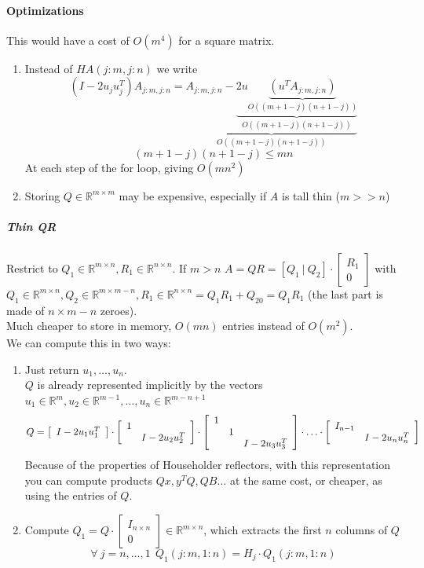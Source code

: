 \documentclass[10pt]{report}
\begin{document}
\paragraph{Optimizations}
This would have a cost of $O(m^4)$ for a square matrix.
\begin{enumerate}
	\item Instead of $HA(j:m,j:n)$ we write
	$$(I-2u_ju_j^T)A_{j:m,j:n}=\underset{O((m+1-j)(n+1-j))}{\underbrace{A_{j:m,j:n}-\underset{O((m+1-j)(n+1-j))}{\underbrace{2u \underset{O((m+1-j)(n+1-j))}{\underbrace{(u^TA_{j:m,j:n})}}}}}}$$
	$$(m+1-j)(n+1-j)\leq mn$$
	At each step of the for loop, giving $O(mn^2)$
	\item Storing $Q \in \mathbb{R}^{m\times m}$ may be expensive, especially if $A$ is tall thin ($m>>n$)
\end{enumerate}
\subparagraph{Thin QR} Restrict to $Q_1\in\mathbb{R}^{m\times n}, R_1\in\mathbb{R}^{n\times n}$. If $m>n$ $A=QR = [Q_1\:|\:Q_2]\cdot\left[\begin{array}{c}
R_1\\\hline0
\end{array}\right]$ with $Q_1\in \mathbb{R}^{m\times n}, Q_2\in \mathbb{R}^{m\times m-n}, R_1\in \mathbb{R}^{n\times n} = Q_1R_1+Q_20 = Q_1R_1$ (the last part is made of $n\times m-n$ zeroes).\\
Much cheaper to store in memory, $O(mn)$ entries instead of $O(m^2)$.\\
We can compute this in two ways:
\begin{enumerate}
	\item Just return $u_1,\ldots,u_n$.\\
	$Q$ is already represented implicitly by the vectors $u_1\in\mathbb{R}^m,u_2\in\mathbb{R}^{m-1},\ldots,u_n\in\mathbb{R}^{m-n+1}$
	$$Q=\left[\begin{array}{c}
	I-2u_1u_1^T
	\end{array}\right]\cdot\left[\begin{array}{c c}
	1\\
	&I-2u_2u_2^T
	\end{array}\right]\cdot\left[\begin{array}{c c c}
	1\\
	&1\\
	&&I-2u_3u_3^T
	\end{array}\right]\cdot\ldots\cdot\left[\begin{array}{c c}
	I_{n-1}\\
	&I-2u_nu_n^T
	\end{array}\right]$$
	Because of the properties of Householder reflectors, with this representation you can compute products $Qx,y^TQ, QB\ldots$ at the same cost, or cheaper, as using the entries of $Q$.
	\item Compute $Q_1=Q\cdot\left[\begin{array}{c}
	I_{n\times n}\\0
	\end{array}\right]\in\mathbb{R}^{m\times n}$, which extracts the first $n$ columns of $Q$
	$$\forall\:j=n,\ldots,1\:\:Q_1(j:m,1:n) = H_j\cdot Q_1(j:m,1:n)$$
\end{enumerate}
\end{document}
